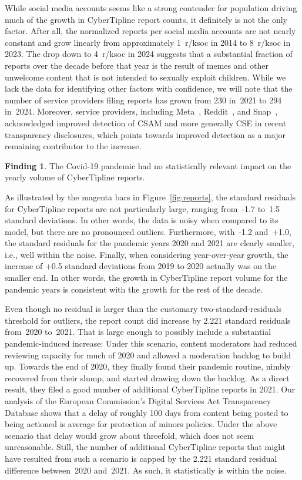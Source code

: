 \documentclass[anonymous,nonacm,screen,12pt]{acmart}
\newcommand\V[1]{{#1}}
\newcommand\V[1]{\textsc{\MakeLowercase{#1}}}
\theoremstyle{definition}
\newtheorem{finding}{Finding}
\begin{document}
While social media accounts seems like a strong contender for population driving
much of the growth in CyberTipline report counts, it definitely is not the only
factor. After all, the normalized reports per social media accounts are not
nearly constant and grow linearly from approximately 1~r/ksoc in 2014 to
8~r/ksoc in 2023. The drop down to 4~r/ksoc in 2024 suggests that a substantial
fraction of reports over the decade before that year is the result of memes and
other unwelcome content that is not intended to sexually exploit children. While
we lack the data for identifying other factors with confidence, we will note
that the number of service providers filing reports has grown from 230 in~2021
to 294 in~2024. Moreover, service providers, including Meta~\cite{Meta2023a},
Reddit~\cite{Reddit2025}, and Snap~\cite{Snap2024}, acknowledged improved
detection of \V{CSAM} and more generally \V{CSE} in recent transparency
disclosures, which points towards improved detection as a major remaining
contributor to the increase.


\begin{finding}
The Covid-19 pandemic had no statistically relevant impact on the yearly volume
of CyberTipline reports.
\end{finding}

\noindent{}As illustrated by the magenta bars in Figure~\ref{fig:reports}, the
standard residuals for CyberTipline reports are not particularly large, ranging
from~-1.7 to~1.5 standard deviations. In other words, the data is noisy when
compared to its model, but there are no pronounced outliers. Furthermore,
with~-1.2 and~+1.0, the standard residuals for the pandemic years 2020 and 2021
are clearly smaller, i.e., well within the noise. Finally, when considering
year-over-year growth, the increase of +0.5 standard deviations from 2019 to
2020 actually was on the smaller end. In other words, the growth in CyberTipline
report volume for the pandemic years is consistent with the growth for the rest
of the decade.

Even though no residual is larger than the customary two-standard-residuals
threshold for outliers, the report count did increase by 2.221 standard
residuals from~2020 to~2021. That is large enough to possibly include a
substantial pandemic-induced increase: Under this scenario, content moderators
had reduced reviewing capacity for much of 2020 and allowed a moderation backlog
to build up. Towards the end of 2020, they finally found their pandemic routine,
nimbly recovered from their slump, and started drawing down the backlog. As a
direct result, they filed a good number of additional CyberTipline reports in
2021. Our analysis of the European Commission's Digital Services Act
Transparency Database shows that a delay of roughly 100 days from content being
posted to being actioned is average for protection of minors policies. Under the
above scenario that delay would grow about threefold, which does not seem
unreasonable. Still, the number of additional CyberTipline reports that might
have resulted from such a scenario is capped by the 2.221 standard residual
difference between~2020 and~2021. As such, it statistically is within the noise.
\end{document}

